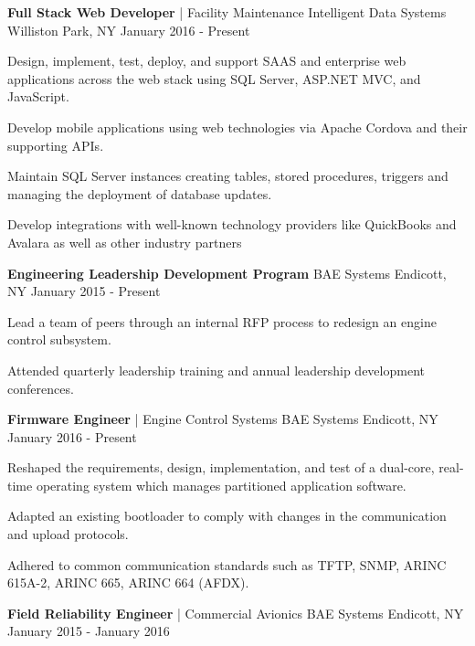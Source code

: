 \begin{cventries}
  \cventry
    {\textbf{Full Stack Web Developer} | Facility Maintenance}
    {Intelligent Data Systems}
    {Williston Park, NY}
    {January 2016 - Present}
    {
      \begin{cvitems}
      	\item {Design, implement, test, deploy, and support SAAS and enterprise web applications across the web stack using SQL Server, ASP.NET MVC, and JavaScript.}
        \item {Develop mobile applications using web technologies via Apache Cordova and their supporting APIs.}
        \item{Maintain SQL Server instances creating tables, stored procedures, triggers and managing the deployment of database updates.}
        \item{Develop integrations with well-known technology providers like QuickBooks and Avalara as well as other industry partners}
      \end{cvitems}
    }
  \cventry
    {\textbf{Engineering Leadership Development Program}}
    {BAE Systems}
    {Endicott, NY}
    {January 2015 - Present}
    {
      \begin{cvitems}
      	\item {Lead a team of peers through an internal RFP process to redesign an engine control subsystem.}
        \item {Attended quarterly leadership training and annual leadership development conferences.}
      \end{cvitems}
    }
  \cventrytwo
    {\textbf{Firmware Engineer} | Engine Control Systems}
    {BAE Systems}
    {Endicott, NY}
    {January 2016 - Present}
    {
      \begin{cvitemstwo}
        \item{Reshaped the requirements, design, implementation, and test of a dual-core, real-time operating system which manages partitioned application software.}
        \item{Adapted an existing bootloader to comply with changes in the communication and upload protocols.}
        \item{Adhered to common communication standards such as TFTP, SNMP, ARINC 615A-2, ARINC 665, ARINC 664 (AFDX).}
      \end{cvitemstwo}
    }
  \cventrytwo
    {\textbf{Field Reliability Engineer} | Commercial Avionics}
    {BAE Systems}
    {Endicott, NY}
    {January 2015 - January 2016}
    {
      \begin{cvitemstwo}

\end{cvitemstwo}}
\end{cventries}
